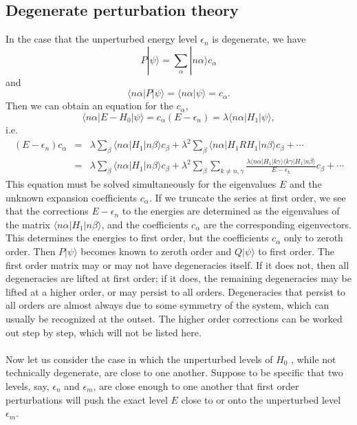 \subsection{Degenerate perturbation theory}
In the case that the unperturbed energy level $\epsilon_n$ is degenerate, we have
\[P|\psi\rangle = \sum_{\alpha} |n\alpha\rangle c_{\alpha}\]
and
\[\langle n\alpha | P |\psi\rangle = \langle n\alpha  |\psi\rangle = c_{\alpha}.\]
Then we can obtain an equation for the $c_{\alpha}$,
\[\langle n\alpha | E-H_0 | \psi\rangle = c_{\alpha}(E-\epsilon_n) = \lambda \langle n\alpha | H_1 | \psi\rangle,\]
i.e.
\begin{eqnarray}
(E-\epsilon_{n})c_{\alpha} &=& \lambda \sum_{\beta} \langle n\alpha | H_1 | n\beta\rangle c_{\beta} + \lambda^2 \sum_{\beta} \langle n\alpha | H_1RH_1 | n\beta\rangle c_{\beta} + \cdots \\
&=& \lambda \sum_{\beta} \langle n\alpha | H_1 | n\beta\rangle c_{\beta}
+ \lambda^2 \sum_{\beta} \sum_{k\neq n,\gamma}  \frac{\lambda \langle n\alpha | H_1|k\gamma\rangle \langle k\gamma | H_1 | n\beta \rangle}{E-\epsilon_k}c_{\beta} + \cdots \nonumber
\end{eqnarray}
This equation must be solved simultaneously for the eigenvalues $E$ and the unknown expansion coefficients $c_{\alpha}$.
If we truncate the series at first order, we see that the corrections $E-\epsilon_{n}$ to the energies are determined as the eigenvalues of the matrix $\langle n\alpha | H_1 | n\beta\rangle$, and the coefficients $c_{\alpha}$ are the corresponding eigenvectors.
This determines the energies to first order, but the coefficients $c_{\alpha}$ only to zeroth order. Then $P|\psi\rangle$ becomes known to zeroth order and $Q|\psi\rangle$ to first order.
The first order matrix may or may not have degeneracies itself. If it does not, then all degeneracies are lifted at first order; if it does, the remaining degeneracies may be lifted at a higher order, or may persist to all orders. Degeneracies that persist to all orders are almost always due to some symmetry of the system, which can usually be recognized at the outset.
The higher order corrections can be worked out step by step, which will not be listed here.
\\ \\
Now let us consider the case in which the unperturbed levels of $H_0$ , while not technically degenerate, are close to one another. Suppose to be specific that two levels, say, $\epsilon_n$ and $\epsilon_m$, are close enough to one another that first order perturbations will push the exact level $E$ close to or onto the unperturbed level $\epsilon_m$.\\
